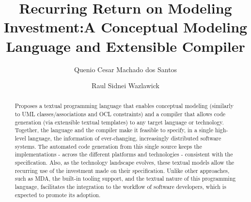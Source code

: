 \documentclass{svproc}
\begin{document}
\mainmatter  %
\title{Recurring Return on Modeling Investment:\newline A Conceptual Modeling Language and Extensible Compiler}
\author{Quenio Cesar Machado dos Santos \and Raul Sidnei Wazlawick}

\maketitle              %

\begin{abstract}
Proposes a textual programming language that enables conceptual modeling (similarly to UML classes/associations and OCL constraints) and a compiler that allows code generation (via extensible textual templates) to any target language or technology. Together, the language and the compiler make it feasible to specify, in a single high-level language, the information of ever-changing, increasingly distributed software systems. The automated code generation from this single source keeps the implementations - across the different platforms and technologies - consistent with the specification. Also, as the technology landscape evolves, these textual models allow the recurring use of the investment made on their specification. Unlike other approaches, such as MDA, the built-in tooling support, and the textual nature of this programming language, facilitates the integration to the workflow of software developers, which is expected to promote its adoption.
\end{abstract}
%
%
%
%
\begin{thebibliography}{6}
%
\end{thebibliography}
\end{document}
